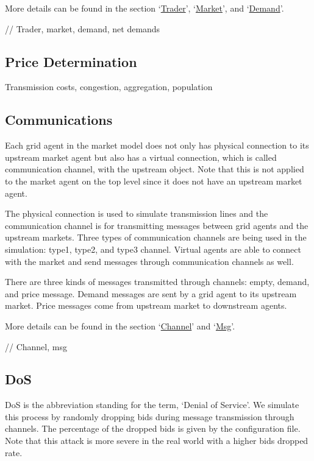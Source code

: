 \documentclass[12pt]{article}
\begin{document}
More details can be found in the section `\hyperref[subsec:objects_trader]{Trader}', 
`\hyperref[subsec:objects_market]{Market}', and `\hyperref[subsec:objects_demand]{Demand}'. 

// Trader, market, demand, net demands 

\subsection{Price Determination} \mbox{}

Transmission costs, congestion, aggregation, population

\subsection{Communications} \mbox{}

Each grid agent in the market model does not only has physical connection to 
its upstream market agent but also has a virtual connection, which is called communication channel, 
with the upstream object. 
Note that this is not applied to the market agent on the top level since it does not have an upstream market agent. 

The physical connection is used to simulate transmission lines and 
the communication channel is for transmitting messages between grid agents and the upstream markets. 
Three types of communication channels are being used in the simulation: type1, type2, and type3 channel. 
Virtual agents are able to connect with the market and send messages through communication channels as well.

There are three kinds of messages transmitted through channels: empty, demand, and price message. 
Demand messages are sent by a grid agent to its upstream market. 
Price messages come from upstream market to downstream agents. 

More details can be found in the section `\hyperref[subsec:objects_channel]{Channel}' and
`\hyperref[subsec:objects_msg]{Msg}'. 

// Channel, msg 

\subsection{DoS} \mbox{}

DoS is the abbreviation standing for the term, `Denial of Service'. 
We simulate this process by randomly dropping bids during message transmission through channels. 
The percentage of the dropped bids is given by the configuration file. 
Note that this attack is more severe in the real world with a higher bids dropped rate.
\end{document}
